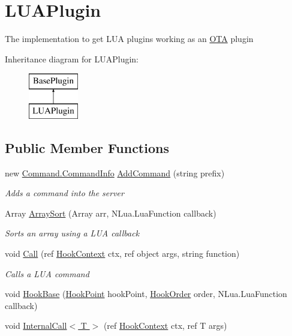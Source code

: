 \hypertarget{classOTA_1_1Plugin_1_1LUAPlugin}{}\section{L\+U\+A\+Plugin}
\label{classOTA_1_1Plugin_1_1LUAPlugin}


The implementation to get L\+U\+A plugins working as an \hyperlink{namespaceOTA}{O\+T\+A} plugin  


Inheritance diagram for L\+U\+A\+Plugin\+:\begin{figure}[H]
\begin{center}
\leavevmode
\includegraphics[height=2.000000cm]{classOTA_1_1Plugin_1_1LUAPlugin}
\end{center}
\end{figure}
\subsection*{Public Member Functions}
\begin{DoxyCompactItemize}
\item 
new \hyperlink{classOTA_1_1Command_1_1CommandInfo}{Command.\+Command\+Info} \hyperlink{classOTA_1_1Plugin_1_1LUAPlugin_a74547444192b65a50fe76a521588331a}{Add\+Command} (string prefix)
\begin{DoxyCompactList}\small\item\em Adds a command into the server \end{DoxyCompactList}\item 
Array \hyperlink{classOTA_1_1Plugin_1_1LUAPlugin_a0e0b343be27b612bdbaa7c79b684962c}{Array\+Sort} (Array arr, N\+Lua.\+Lua\+Function callback)
\begin{DoxyCompactList}\small\item\em Sorts an array using a L\+U\+A callback \end{DoxyCompactList}\item 
void \hyperlink{classOTA_1_1Plugin_1_1LUAPlugin_a9fc6b6db6fe2d5d681c11009d8d3c2a1}{Call} (ref \hyperlink{structOTA_1_1Plugin_1_1HookContext}{Hook\+Context} ctx, ref object args, string function)
\begin{DoxyCompactList}\small\item\em Calls a L\+U\+A command \end{DoxyCompactList}\item 
void \hyperlink{classOTA_1_1Plugin_1_1LUAPlugin_a4e658328a346895859779815d61fce9c}{Hook\+Base} (\hyperlink{classOTA_1_1Plugin_1_1HookPoint}{Hook\+Point} hook\+Point, \hyperlink{namespaceOTA_1_1Plugin_a7c65b8c7c155fec0b559afbe2da809c0}{Hook\+Order} order, N\+Lua.\+Lua\+Function callback)
\item 
void \hyperlink{classOTA_1_1Plugin_1_1LUAPlugin_aed294407ecd564699fb18ca0b1121b4f}{Internal\+Call$<$ T $>$} (ref \hyperlink{structOTA_1_1Plugin_1_1HookContext}{Hook\+Context} ctx, ref T args)
\end{DoxyCompactItemize}
